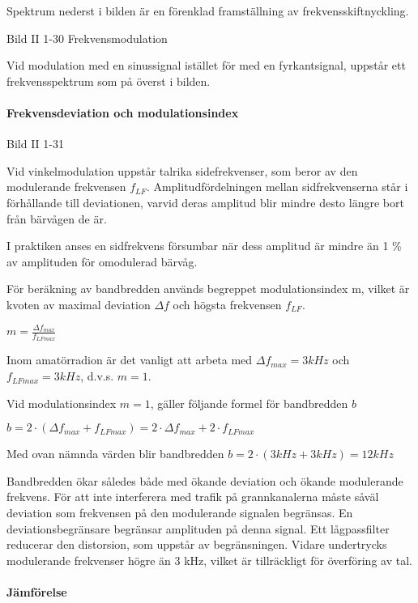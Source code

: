 Spektrum nederst i bilden är en förenklad framställning av frekvensskiftnyckling.

Bild II 1-30 Frekvensmodulation

Vid modulation med en sinussignal istället för med en fyrkantsignal, uppstår ett
frekvensspektrum som på överst i bilden.

\paragraph{Frekvensdeviation och modulationsindex}

Bild II 1-31

Vid vinkelmodulation uppstår talrika sidefrekvenser, som beror av den modulerande
frekvensen $f_{LF}$. Amplitudfördelningen mellan sidfrekvenserna står i förhållande till
deviationen, varvid deras amplitud blir mindre desto längre bort från bärvågen de är.

I praktiken anses en sidfrekvens försumbar när dess amplitud är mindre än 1 \% av
amplituden för omodulerad bärvåg.

För beräkning av bandbredden används begreppet modulationsindex m, vilket är kvoten av
maximal deviation $\Delta f$ och högsta frekvensen $f_{LF}$.

$m = \frac{\Delta f_{max}}{f_{LFmax}}$

Inom amatörradion är det vanligt att arbeta med $\Delta f_{max} = 3 kHz$ och
$f_{LFmax} = 3 kHz$, d.v.s. $m = 1$.

Vid modulationsindex $m = 1$, gäller följande
formel för bandbredden $b$

$b = 2 \cdot ( \Delta f_{max} + f_{LFmax}) = 2 \cdot \Delta f_{max} + 2 \cdot f_{LFmax}$

Med ovan nämnda värden blir bandbredden $b = 2 \cdot (3 kHz + 3 kHz) = 12 kHz$

Bandbredden ökar således både med ökande deviation och ökande modulerande frekvens. För
att inte interferera med trafik på grannkanalerna måste såväl deviation som frekvensen på
den modulerande signalen begränsas. En deviationsbegränsare begränsar amplituden på denna
signal. Ett lågpassfilter reducerar den distorsion, som uppstår av begränsningen. Vidare
undertrycks modulerande frekvenser högre än 3 kHz, vilket är tillräckligt för överföring
av tal.

\paragraph{Jämförelse}

